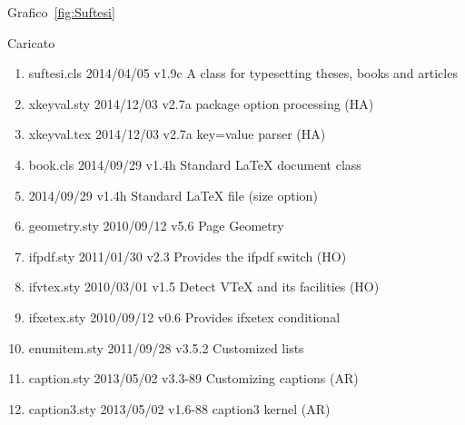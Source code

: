 
Grafico~\vref{fig:Suftesi}

Caricato
\begin{enumerate}
\item suftesi.cls 2014/04/05 v1.9c A class for typesetting theses, books and articles
\item xkeyval.sty 2014/12/03 v2.7a package option processing (HA)
\item xkeyval.tex 2014/12/03 v2.7a key=value parser (HA)
\item book.cls 2014/09/29 v1.4h Standard LaTeX document class
\item {} 2014/09/29 v1.4h Standard LaTeX file (size option)
\item geometry.sty 2010/09/12 v5.6 Page Geometry
\item ifpdf.sty 2011/01/30 v2.3 Provides the ifpdf switch (HO)
\item ifvtex.sty 2010/03/01 v1.5 Detect VTeX and its facilities (HO)
\item ifxetex.sty 2010/09/12 v0.6 Provides ifxetex conditional
\item enumitem.sty 2011/09/28 v3.5.2 Customized lists
\item caption.sty 2013/05/02 v3.3-89 Customizing captions (AR)
\item caption3.sty 2013/05/02 v1.6-88 caption3 kernel (AR)


\end{enumerate}
